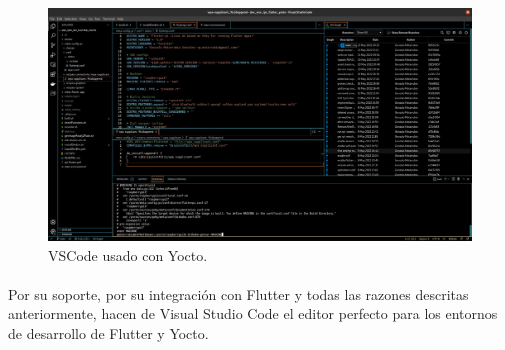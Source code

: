 \begin{figure}[H]
	\centering
	\includegraphics[width=0.90\linewidth]{imgs/vscode-perspective}
	\caption[VSCode yocto]{VSCode usado con Yocto.}
	\label{fig:vscode-perpective}
\end{figure}

\paragraph{}Por su soporte, por su integración con Flutter y todas las razones descritas
anteriormente, hacen de Visual Studio Code el editor perfecto para los entornos de desarrollo
de Flutter y Yocto.

